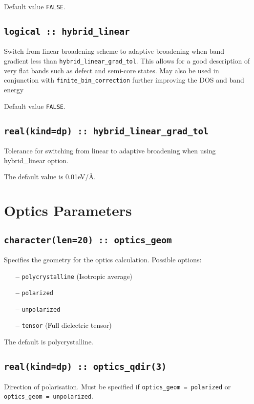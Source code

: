 \documentclass[a4paper,11pt,twoside]{book}
\begin{document}
Default value \verb#FALSE#.

\subsection[hybrid\_linear]{\tt logical :: hybrid\_linear}
Switch from linear broadening scheme to adaptive broadening when band gradient less than \verb#hybrid_linear_grad_tol#. 
This allows for a good description of very flat bands such as defect and semi-core states. May also be used in conjunction 
with \verb#finite_bin_correction# further improving the DOS and band energy

Default value \verb#FALSE#.

\subsection[hybrid\_linear\_grad\_tol]{\tt real(kind=dp) :: hybrid\_linear\_grad\_tol}
Tolerance for switching from linear to adaptive broadening when using hybrid\_linear option.

The default value is 0.01eV/\AA.

\section{Optics Parameters}

\subsection[optics\_geom]{\tt character(len=20) :: optics\_geom}

Specifies the geometry for the optics calculation.  Possible options:
\begin{itemize}
\item[{\bf --}]  \verb#polycrystalline# (Isotropic average)
\item[{\bf --}]  \verb#polarized#  
\item[{\bf --}]  \verb#unpolarized# 
\item[{\bf --}]  \verb#tensor# (Full dielectric tensor)
\end{itemize}
The default is polycrystalline.

\subsection[optics\_qdir]{\tt real(kind=dp) :: optics\_qdir(3)}
Direction of polarisation. Must be specified if \verb#optics_geom = polarized#  
or \verb#optics_geom = unpolarized#.
\end{document}
